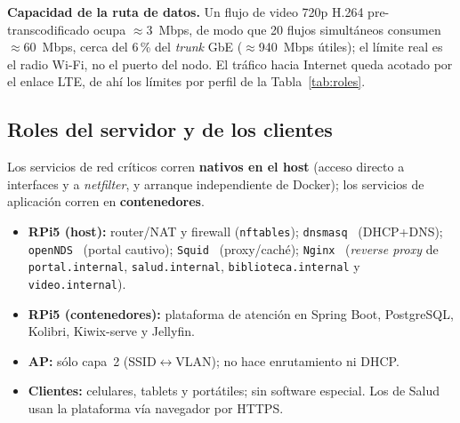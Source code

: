 \documentclass[conference]{IEEEtran}
\begin{document}
\textbf{Capacidad de la ruta de datos.} Un flujo de video 720p H.264 pre-transcodificado ocupa $\approx$3~Mbps, de modo que 20 flujos simultáneos consumen $\approx$60~Mbps, cerca del 6\,\% del \textit{trunk} GbE ($\approx$940~Mbps útiles); el límite real es el radio Wi-Fi, no el puerto del nodo. El tráfico hacia Internet queda acotado por el enlace LTE, de ahí los límites por perfil de la Tabla~\ref{tab:roles}.

\subsection{Roles del servidor y de los clientes}
Los servicios de red críticos corren \textbf{nativos en el host} (acceso directo a interfaces y a \textit{netfilter}, y arranque independiente de Docker); los servicios de aplicación corren en \textbf{contenedores}.
\begin{itemize}
  \item \textbf{RPi5 (host):} router/NAT y firewall (\texttt{nftables}); \texttt{dnsmasq}~\cite{dnsmasq} (DHCP+DNS); \texttt{openNDS}~\cite{opennds} (portal cautivo); \texttt{Squid}~\cite{squid} (proxy/caché); \texttt{Nginx}~\cite{nginx} (\textit{reverse proxy} de \texttt{portal.internal}, \texttt{salud.internal}, \texttt{biblioteca.internal} y \texttt{video.internal}).
  \item \textbf{RPi5 (contenedores):} plataforma de atención en Spring Boot, PostgreSQL, Kolibri, Kiwix-serve y Jellyfin.
  \item \textbf{AP:} sólo capa~2 (SSID$\leftrightarrow$VLAN); no hace enrutamiento ni DHCP.
  \item \textbf{Clientes:} celulares, tablets y portátiles; sin software especial. Los de Salud usan la plataforma vía navegador por HTTPS.
\end{itemize}
\end{document}

